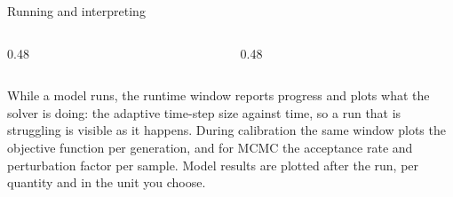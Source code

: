 \documentclass[aspectratio=169, 10pt]{beamer}
\begin{document}
\begin{frame}{Running and interpreting}
  \begin{columns}[T,onlytextwidth]
    \begin{column}{0.48\textwidth}
    \end{column}
    \begin{column}{0.48\textwidth}
    \end{column}
  \end{columns}
  \vspace{0.3em}
  {\scriptsize While a model runs, the runtime window reports progress and
  plots what the \alert{solver} is doing: the adaptive time-step size against
  time, so a run that is struggling is visible as it happens. During
  calibration the same window plots the objective function per generation, and
  for MCMC the acceptance rate and perturbation factor per sample. Model
  results are plotted after the run, per quantity and in the unit you choose.}
\end{frame}
\end{document}
